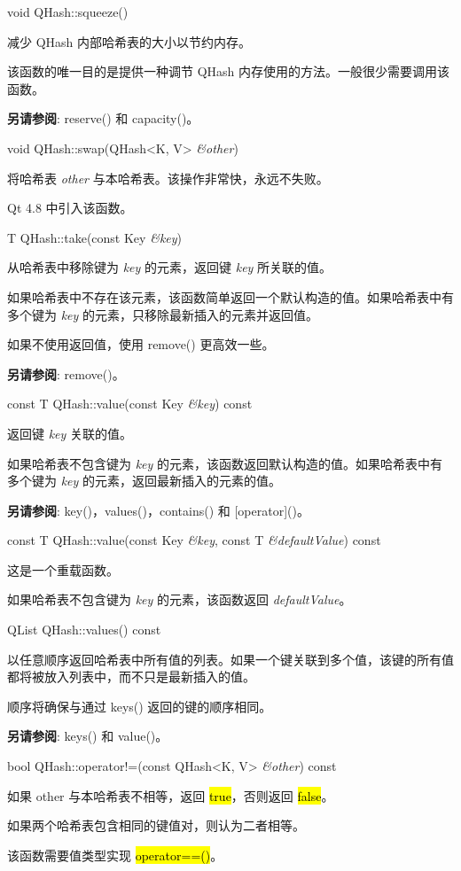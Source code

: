 void QHash::squeeze()

减少 QHash 内部哈希表的大小以节约内存。

该函数的唯一目的是提供一种调节 QHash 内存使用的方法。一般很少需要调用该函数。

\textbf{另请参阅}: reserve() 和 capacity()。

void QHash::swap(QHash<K, V> \emph{\&other})

将哈希表 \emph{other} 与本哈希表。该操作非常快，永远不失败。

Qt 4.8 中引入该函数。

T QHash::take(const Key \emph{\&key})

从哈希表中移除键为 \emph{key} 的元素，返回键 \emph{key} 所关联的值。

如果哈希表中不存在该元素，该函数简单返回一个默认构造的值。如果哈希表中有多个键为 \emph{key} 的元素，只移除最新插入的元素并返回值。

如果不使用返回值，使用 remove() 更高效一些。

\textbf{另请参阅}: remove()。

const T QHash::value(const Key \emph{\&key}) const

返回键 \emph{key} 关联的值。

如果哈希表不包含键为 \emph{key} 的元素，该函数返回默认构造的值。如果哈希表中有多个键为 \emph{key} 的元素，返回最新插入的元素的值。

\textbf{另请参阅}: key()，values()，contains() 和 [operator]()。

const T QHash::value(const Key \emph{\&key}, const T \emph{\&defaultValue}) const

这是一个重载函数。

如果哈希表不包含键为 \emph{key} 的元素，该函数返回 \emph{defaultValue}。

QList QHash::values() const

以任意顺序返回哈希表中所有值的列表。如果一个键关联到多个值，该键的所有值都将被放入列表中，而不只是最新插入的值。

顺序将确保与通过 keys() 返回的键的顺序相同。

\textbf{另请参阅}: keys() 和 value()。

bool QHash::operator!=(const QHash<K, V> \emph{\&other}) const

如果 other 与本哈希表不相等，返回 \hl{true}，否则返回 \hl{false}。

如果两个哈希表包含相同的键值对，则认为二者相等。

该函数需要值类型实现 \hl{operator==()}。

